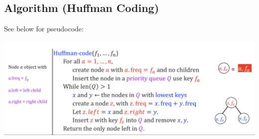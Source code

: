 \documentclass[10pt]{article}
\begin{document}
	\subsection{Algorithm (Huffman Coding)} 
	See below for pseudocode:
	\begin{center}
		\includegraphics[scale=0.5]{Huffman.png}
	\end{center}
\end{document}
